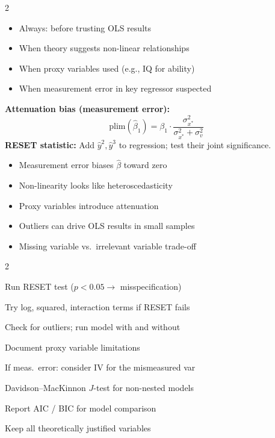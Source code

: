 \documentclass[10pt,a4paper]{article}
\begin{document}
\begin{multicols}{2}

\begin{tcolorbox}[when]
\begin{itemize}
  \item Always: before trusting OLS results
  \item When theory suggests non-linear relationships
  \item When proxy variables used (e.g., IQ for ability)
  \item When measurement error in key regressor suspected
\end{itemize}
\end{tcolorbox}

\begin{tcolorbox}[key]
\textbf{Attenuation bias (measurement error):}
\[
\text{plim}(\hat\beta_1) = \beta_1 \cdot \frac{\sigma^2_{x^*}}{\sigma^2_{x^*} + \sigma^2_v}
\]
\textbf{RESET statistic:} Add $\hat{y}^2, \hat{y}^3$ to regression; test their joint significance.
\end{tcolorbox}

\columnbreak

\begin{tcolorbox}[watchout]
\begin{itemize}
  \item Measurement error biases $\hat\beta$ toward zero
  \item Non-linearity looks like heteroscedasticity
  \item Proxy variables introduce attenuation
  \item Outliers can drive OLS results in small samples
  \item Missing variable vs.\ irrelevant variable trade-off
\end{itemize}
\end{tcolorbox}

\end{multicols}

\begin{tcolorbox}[checklist]
\begin{multicols}{2}
\begin{checklist}
  \item Run RESET test ($p < 0.05 \to$ misspecification)
  \item Try log, squared, interaction terms if RESET fails
  \item Check for outliers; run model with and without
  \item Document proxy variable limitations
  \item If meas.\ error: consider IV for the mismeasured var
  \item Davidson--MacKinnon $J$-test for non-nested models
  \item Report AIC / BIC for model comparison
  \item Keep all theoretically justified variables
\end{checklist}
\end{multicols}
\end{tcolorbox}
\end{document}
